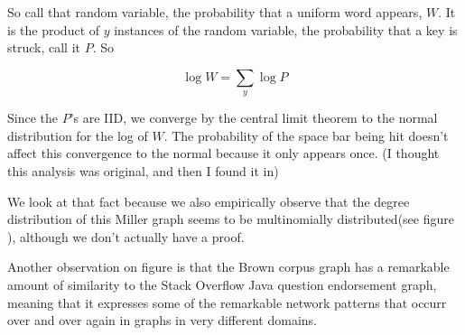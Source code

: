 \documentclass[12pt]{article}
\begin{document}
So call that random variable, the probability that a uniform word appears, $W$. It is the product of $y$ instances of the random variable, the probability that a key is struck, call it $P$. So

$$ \log W = \sum_y \log P $$

Since the $P$'s are IID, we converge by the central limit theorem to the normal distribution for the log of $W$. The probability of the space bar being hit doesn't affect this convergence to the normal because it only appears once. (I thought this analysis was original, and then I found it in) %

We look at that fact because we also empirically observe that the degree distribution of this Miller graph seems to be multinomially distributed(see figure \label{fig:plots}), although we don't actually have a proof.

Another observation on figure \label{fig:plots} is that the Brown corpus graph has a remarkable amount of similarity to the Stack Overflow Java question endorsement graph, meaning that it expresses some of the remarkable network patterns that occurr over and over again in graphs in very different domains. %
\end{document}
